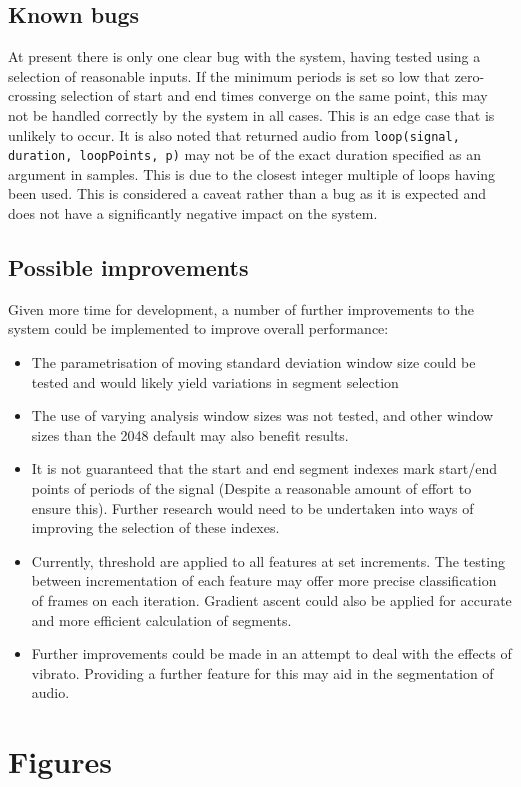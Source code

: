 \documentclass[titlepage]{scrartcl}
\begin{document}
\subsection{Known bugs}
At present there is only one clear bug with the system, having tested using a
selection of reasonable inputs. If the minimum periods is set so low that
zero-crossing selection of start and end times converge on the same point, this
may not be handled correctly by the system in all cases. This is an edge case
that is unlikely to occur.
It is also noted that returned audio from \texttt{loop(signal, duration,
loopPoints, p)} may not be of the exact duration specified as an argument in
samples. This is due to the closest integer multiple of loops having been used.
This is considered a caveat rather than a bug as it is expected and does not
have a significantly negative impact on the system.

\subsection{Possible improvements}
Given more time for development, a number of further improvements to the system
could be implemented to improve overall performance:
\begin{itemize}
    \item The parametrisation of moving standard deviation window size could
        be tested and would likely yield variations in segment selection
    \item The use of varying analysis window sizes was not tested, and other
        window sizes than the 2048 default may also benefit results.
    \item It is not guaranteed that the start and end segment indexes mark
        start/end points of periods of the signal (Despite a reasonable amount
        of effort to ensure this). Further research would need to be undertaken
        into ways of improving the selection of these indexes.
    \item Currently, threshold are applied to all features at set increments.
        The testing between incrementation of each feature may offer more
        precise classification of frames on each iteration. Gradient ascent
        could also be applied for accurate and more efficient calculation of
        segments.
    \item Further improvements could be made in an attempt to deal with the
        effects of vibrato. Providing a further feature for this may aid in the
        segmentation of audio.
\end{itemize}

\section{Figures}

\printbibliography
\end{document}
